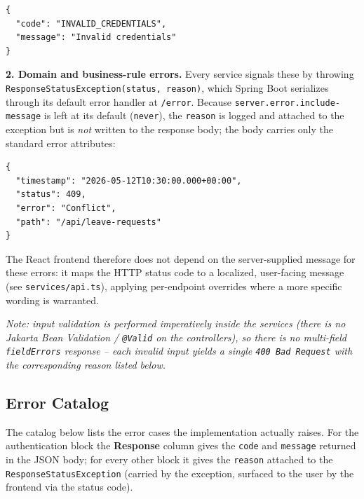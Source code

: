 \documentclass[11pt,a4paper]{article}
\begin{document}
\begin{lstlisting}[style=json]
{
  "code": "INVALID_CREDENTIALS",
  "message": "Invalid credentials"
}
\end{lstlisting}

\textbf{2. Domain and business-rule errors.} Every service signals these by throwing
\texttt{ResponseStatusException(status, reason)}, which Spring Boot serializes through its
default error handler at \texttt{/error}. Because \texttt{server.error.include-message} is
left at its default (\texttt{never}), the \texttt{reason} is logged and attached to the
exception but is \emph{not} written to the response body; the body carries only the standard
error attributes:

\begin{lstlisting}[style=json]
{
  "timestamp": "2026-05-12T10:30:00.000+00:00",
  "status": 409,
  "error": "Conflict",
  "path": "/api/leave-requests"
}
\end{lstlisting}

The React frontend therefore does not depend on the server-supplied message for these errors:
it maps the HTTP status code to a localized, user-facing message (see \texttt{services/api.ts}),
applying per-endpoint overrides where a more specific wording is warranted.

\textit{Note: input validation is performed imperatively inside the services (there is no
Jakarta Bean Validation / \texttt{@Valid} on the controllers), so there is no multi-field
\texttt{fieldErrors} response -- each invalid input yields a single \texttt{400 Bad Request}
with the corresponding reason listed below.}

\subsection{Error Catalog}

The catalog below lists the error cases the implementation actually raises. For the
authentication block the \textbf{Response} column gives the \texttt{code} and \texttt{message}
returned in the JSON body; for every other block it gives the \texttt{reason} attached to the
\texttt{ResponseStatusException} (carried by the exception, surfaced to the user by the
frontend via the status code).
\end{document}
